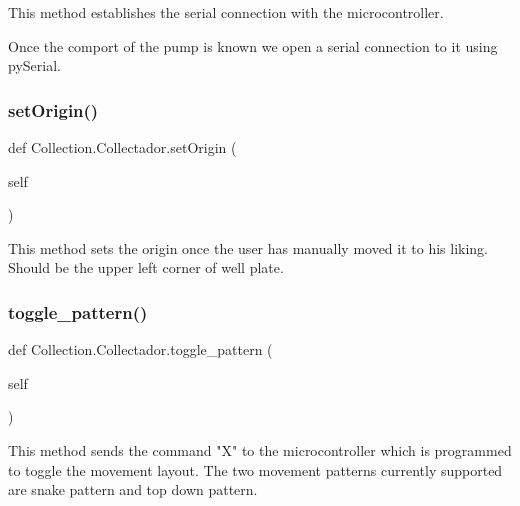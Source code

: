 \begin{DoxyVerb}This method establishes the serial connection with the microcontroller.

Once the comport of the pump is known we open a serial connection to it using pySerial.
\end{DoxyVerb}
 \mbox{\label{class_collection_1_1_collectador_a062823e41a786cd0f1577b02bf14ed67}} 
\subsubsection{\texorpdfstring{setOrigin()}{setOrigin()}}
{\footnotesize\ttfamily def Collection.\+Collectador.\+set\+Origin (\begin{DoxyParamCaption}\item[{}]{self }\end{DoxyParamCaption})}

\begin{DoxyVerb}This method sets the origin once the user has manually moved it to his liking.
Should be the upper left corner of well plate.
\end{DoxyVerb}
 \mbox{\label{class_collection_1_1_collectador_afe1f8b5d2328cf6ea624682ea716401a}} 
\subsubsection{\texorpdfstring{toggle\_pattern()}{toggle\_pattern()}}
{\footnotesize\ttfamily def Collection.\+Collectador.\+toggle\+\_\+pattern (\begin{DoxyParamCaption}\item[{}]{self }\end{DoxyParamCaption})}

\begin{DoxyVerb}This method sends the command "X" to the microcontroller which is programmed to toggle the movement layout.
The two movement patterns currently supported are snake pattern and top down pattern.
\end{DoxyVerb}
 

